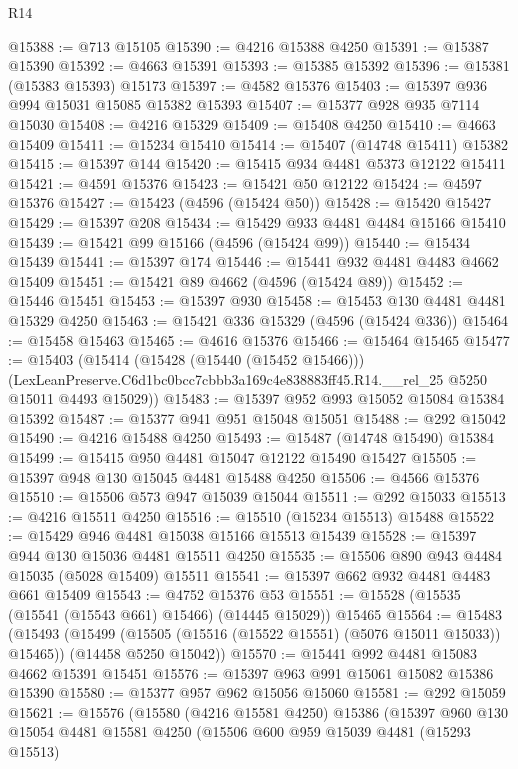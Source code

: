 \begin{lexlean}{R14}
\begin{coremodule}
@15388 := @713 @15105
@15390 := @4216 @15388 @4250
@15391 := @15387 @15390
@15392 := @4663 @15391
@15393 := @15385 @15392
@15396 := @15381 (@15383 @15393) @15173
@15397 := @4582 @15376
@15403 := @15397 @936 @994 @15031 @15085 @15382 @15393
@15407 := @15377 @928 @935 @7114 @15030
@15408 := @4216 @15329
@15409 := @15408 @4250
@15410 := @4663 @15409
@15411 := @15234 @15410
@15414 := @15407 (@14748 @15411) @15382
@15415 := @15397 @144
@15420 := @15415 @934 @4481 @5373 @12122 @15411
@15421 := @4591 @15376
@15423 := @15421 @50 @12122
@15424 := @4597 @15376
@15427 := @15423 (@4596 (@15424 @50))
@15428 := @15420 @15427
@15429 := @15397 @208
@15434 := @15429 @933 @4481 @4484 @15166 @15410
@15439 := @15421 @99 @15166 (@4596 (@15424 @99))
@15440 := @15434 @15439
@15441 := @15397 @174
@15446 := @15441 @932 @4481 @4483 @4662 @15409
@15451 := @15421 @89 @4662 (@4596 (@15424 @89))
@15452 := @15446 @15451
@15453 := @15397 @930
@15458 := @15453 @130 @4481 @4481 @15329 @4250
@15463 := @15421 @336 @15329 (@4596 (@15424 @336))
@15464 := @15458 @15463
@15465 := @4616 @15376
@15466 := @15464 @15465
@15477 := @15403
    (@15414
      (@15428 (@15440 (@15452 @15466)))
      (LexLeanPreserve.C6d1bc0bcc7cbbb3a169c4e838883ff45.R14.__rel_25 @5250 @15011 @4493 @15029))
@15483 := @15397 @952 @993 @15052 @15084 @15384 @15392
@15487 := @15377 @941 @951 @15048 @15051
@15488 := @292 @15042
@15490 := @4216 @15488 @4250
@15493 := @15487 (@14748 @15490) @15384
@15499 := @15415 @950 @4481 @15047 @12122 @15490 @15427
@15505 := @15397 @948 @130 @15045 @4481 @15488 @4250
@15506 := @4566 @15376
@15510 := @15506 @573 @947 @15039 @15044
@15511 := @292 @15033
@15513 := @4216 @15511 @4250
@15516 := @15510 (@15234 @15513) @15488
@15522 := @15429 @946 @4481 @15038 @15166 @15513 @15439
@15528 := @15397 @944 @130 @15036 @4481 @15511 @4250
@15535 := @15506 @890 @943 @4484 @15035 (@5028 @15409) @15511
@15541 := @15397 @662 @932 @4481 @4483 @661 @15409
@15543 := @4752 @15376 @53
@15551 := @15528 (@15535 (@15541 (@15543 @661) @15466) (@14445 @15029)) @15465
@15564 := @15483
    (@15493
      (@15499 (@15505 (@15516 (@15522 @15551) (@5076 @15011 @15033)) @15465))
      (@14458 @5250 @15042))
@15570 := @15441 @992 @4481 @15083 @4662 @15391 @15451
@15576 := @15397 @963 @991 @15061 @15082 @15386 @15390
@15580 := @15377 @957 @962 @15056 @15060
@15581 := @292 @15059
@15621 := @15576
    (@15580
      (@4216 @15581 @4250)
      @15386
      (@15397
        @960
        @130
        @15054
        @4481
        @15581
        @4250
        (@15506
          @600
          @959
          @15039
          @4481
          (@15293 @15513)

\end{coremodule}
\end{lexlean}
